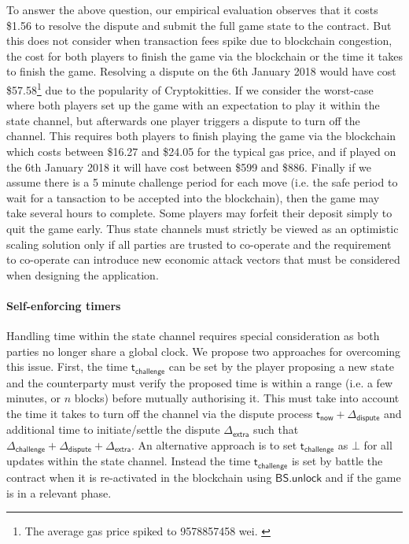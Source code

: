 \documentclass{llncs}
\newcommand{\battleshipunlock}{\mathsf{BS.unlock}}
\newcommand{\timerchallenge}{\mathsf{\Delta}_{\mathsf{challenge}}}
\newcommand{\timechallenge}{\mathsf{t}_{\mathsf{challenge}}}
\newcommand{\timerextra}{\mathsf{\Delta}_{\mathsf{extra}}}
\newcommand{\timerdispute}{\mathsf{\Delta}_{\mathsf{dispute}}}
\newcommand{\timenow}{\mathsf{t}_{\mathsf{now}}}
\newcommand{\timedispute}{\timenow + \mathsf{\Delta}_{\mathsf{dispute}}}
\begin{document}
To answer the above question, our empirical evaluation observes that it costs \$1.56 to resolve the dispute and submit the full game state to the contract.
But this does not consider when transaction fees spike due to blockchain congestion, the cost for both players to finish the game via the blockchain or the time it takes to finish the game. 
Resolving a dispute on the 6th January 2018 would have cost \$57.58\footnote{The average gas price spiked to 9578857458 wei. \cite{etherscan}} due to the popularity of Cryptokitties. 
If we consider the worst-case where both players set up the game with an expectation to play it within the state channel, but afterwards one player triggers a dispute to turn off the channel. 
This requires both players to finish playing the game via the blockchain which costs between \$16.27 and \$24.05 for the typical gas price, and if played on the 6th January 2018 it will have cost between \$599 and \$886. 
Finally if we assume there is a 5 minute challenge period for each move (i.e. the safe period to wait for a tansaction to be accepted into the blockchain), then the game may take several hours to complete.
Some players may forfeit their deposit simply to quit the game early. 
Thus state channels must strictly be viewed as an optimistic scaling solution only if all parties are trusted to co-operate and the requirement to co-operate can introduce new economic attack vectors that must be considered when designing the application. 

\paragraph{Self-enforcing  timers} 
Handling time within the state channel requires special consideration as both parties no longer share a global clock.
We propose two approaches for overcoming this issue. 
First, the time $\timechallenge$ can be set by the player proposing a new state and the counterparty must verify the proposed time is within a range (i.e. a few minutes, or $n$ blocks) before mutually authorising it.
This must take into account the time it takes to turn off the channel via the dispute process  $\timedispute$ and additional time to initiate/settle the dispute $\timerextra$ such that $\timerchallenge + \timerdispute + \timerextra$. 
An alternative approach is to set $\timechallenge$ as $\bot$ for all updates within the state channel. 
Instead the time $\timechallenge$ is set by battle the contract when it is re-activated in the blockchain using $\battleshipunlock$ and if the game is in a relevant phase.
\end{document}
